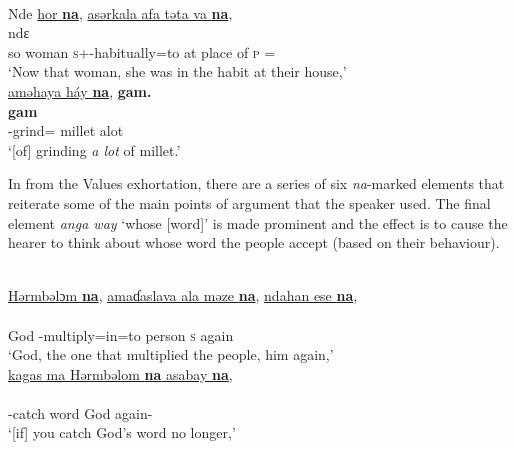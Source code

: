 \ea \label{ex:11:46}\\
Nde  \uline{hor  \textbf{na}},  \uline{asərkala  afa  təta  va  \textbf{na}},\\
\gll  ndɛ               \\ 
      so woman {\PSP} \textsc{s}+{\PFV}-{habitually}=to {at place of} \textsc{p} ={\PRF} {\PSP}\\ 
\glt ‘Now that woman, she was in the habit at their house,’\\      
      
      \medskip
\underline{aməhaya  háy  \textbf{na}},  \textbf{gam.}\\      
\gll {}    \textbf{gam}\\
     {\DEP}-grind={\PLU}  millet {\PSP} alot\\
\glt  ‘[of] grinding \textit{a lot} of millet.’  
\z

In  from the Values exhortation, there are a series of six \textit{na}-marked elements that reiterate some of the main points of argument that the speaker used. The final element \textit{anga way} ‘whose [word]’ is made prominent and the effect is to cause the hearer to think about whose word the people accept (based on their behaviour). 

\newpage 
\ea \label{ex:11:47}\\
\underline{Hərmbəlɔm  \textbf{na}},  \underline{amaɗaslava  ala  məze  \textbf{na}},  \underline{ndahan  ese  \textbf{na}},\\    
\gll  {}                        \\  
      God  {\PSP}    {\DEP}-multiply=in=to  person  {\PSP}  \textsc{s}  again  {\PSP}\\  
\glt ‘God, the one that multiplied the people, him again,’ \\

\medskip
\underline{kagas  ma  Hərmbəlom  \textbf{na}  asabay  \textbf{na}},\\
\gll {}       \\
     {\twoS}-catch  word God  {\PSP} again-{\NEG}   {\PSP}  \\
\glt ‘[if] you catch God's word no longer,’\\

